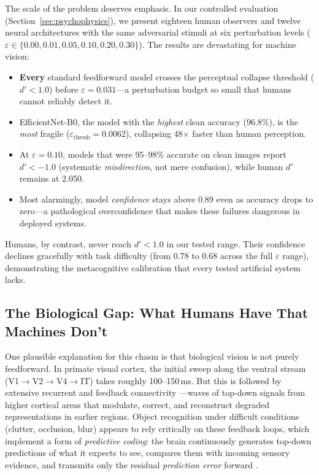 \documentclass[12pt,a4paper]{article}
\begin{document}
The scale of the problem deserves emphasis. In our controlled evaluation
(Section~\ref{sec:psychophysics}), we present eighteen human observers and
twelve neural architectures with the same adversarial stimuli at six
perturbation levels ($\varepsilon \in \{0.00, 0.01, 0.05, 0.10, 0.20,
0.30\}$). The results are devastating for machine vision:

\begin{itemize}[leftmargin=1.5em]
  \item \textbf{Every} standard feedforward model crosses the perceptual
        collapse threshold ($d' < 1.0$) before $\varepsilon = 0.031$---a
        perturbation budget so small that humans cannot reliably detect it.
  \item EfficientNet-B0, the model with the \textit{highest} clean accuracy
        (96.8\%), is the \textit{most} fragile
        ($\varepsilon_{\text{thresh}} = 0.0062$), collapsing 48$\times$
        faster than human perception.
  \item At $\varepsilon = 0.10$, models that were 95--98\% accurate on clean
        images report $d' < -1.0$ (systematic \textit{misdirection}, not
        mere confusion), while human $d'$ remains at 2.050.
  \item Most alarmingly, model \textit{confidence} stays above 0.89 even as
        accuracy drops to zero---a pathological overconfidence that makes
        these failures dangerous in deployed systems.
\end{itemize}

Humans, by contrast, never reach $d' < 1.0$ in our tested range. Their
confidence declines gracefully with task difficulty (from 0.78 to 0.68
across the full $\varepsilon$ range), demonstrating the metacognitive
calibration that every tested artificial system lacks.

\subsection{The Biological Gap: What Humans Have That Machines Don't}

One plausible explanation for this chasm is that biological vision is not
purely feedforward. In primate visual cortex, the initial sweep along the
ventral stream (V1$\to$V2$\to$V4$\to$IT) takes roughly 100--150\,ms. But
this is followed by extensive recurrent and feedback connectivity
\citep{dicarlo2007untangling}---waves of top-down signals from higher
cortical areas that modulate, correct, and reconstruct degraded representations
in earlier regions. Object recognition under difficult conditions (clutter,
occlusion, blur) appears to rely critically on these feedback loops, which
implement a form of \textit{predictive coding}: the brain continuously
generates top-down predictions of what it expects to see, compares them with
incoming sensory evidence, and transmits only the residual \textit{prediction
error} forward \citep{rao1999predictive}.
\end{document}
